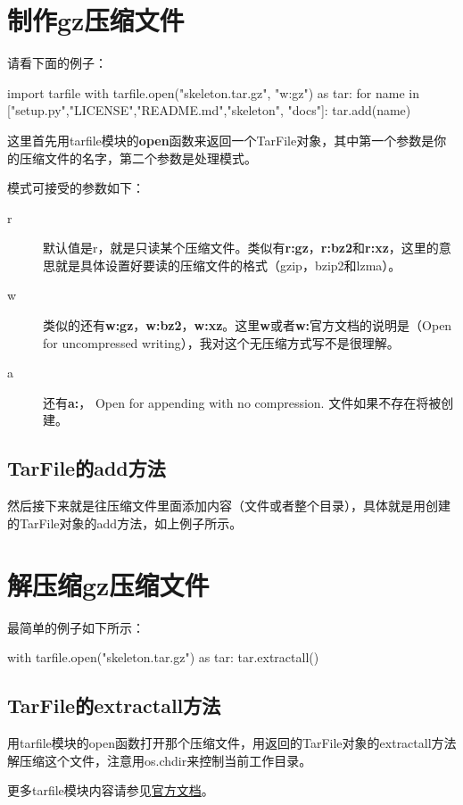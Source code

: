 \documentclass[12pt,oneside]{book}
\begin{document}
\begin{common-format}
\section{制作gz压缩文件}
请看下面的例子：
\begin{tcbpython}[]
import tarfile
with tarfile.open("skeleton.tar.gz", "w:gz") as tar:
    for name in ["setup.py","LICENSE","README.md","skeleton", "docs"]:
        tar.add(name)
\end{tcbpython}

这里首先用tarfile模块的\textbf{open}函数来返回一个TarFile对象，其中第一个参数是你的压缩文件的名字，第二个参数是处理模式。

模式可接受的参数如下：
\begin{description}
\item[r] 默认值是r，就是只读某个压缩文件。类似有\textbf{r:gz}，\textbf{r:bz2}和\textbf{r:xz}，这里的意思就是具体设置好要读的压缩文件的格式（gzip，bzip2和lzma）。
\item[w] 类似的还有\textbf{w:gz}，\textbf{w:bz2}，\textbf{w:xz}。这里\textbf{w}或者\textbf{w:}官方文档的说明是（Open for uncompressed writing），我对这个无压缩方式写不是很理解。
\item[a] 还有\textbf{a:}， 	Open for appending with no compression. 文件如果不存在将被创建。
\end{description}

\subsection{TarFile的add方法}
然后接下来就是往压缩文件里面添加内容（文件或者整个目录），具体就是用创建的TarFile对象的add方法，如上例子所示。

\section{解压缩gz压缩文件}
最简单的例子如下所示：
\begin{tcbpython}[]
with tarfile.open("skeleton.tar.gz") as tar:
    tar.extractall()
\end{tcbpython}

\subsection{TarFile的extractall方法}
用tarfile模块的open函数打开那个压缩文件，用返回的TarFile对象的extractall方法解压缩这个文件，注意用os.chdir来控制当前工作目录。


\begin{large}
更多tarfile模块内容请参见\href{https://docs.python.org/3.4/library/tarfile.html}{官方文档}。
\end{large}


\end{common-format}
\end{document}
